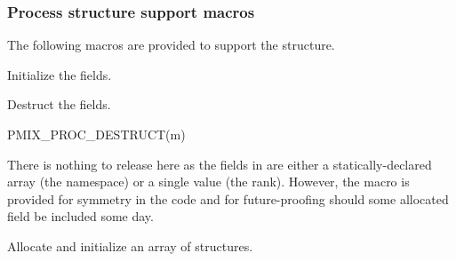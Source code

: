 \subsubsection{Process structure support macros}
The following macros are provided to support the  structure.


Initialize the  fields.


\begin{arglist}
\end{arglist}


Destruct the  fields.

\cspecificstart
\begin{codepar}
PMIX_PROC_DESTRUCT(m)
\end{codepar}
\cspecificend

\begin{arglist}
\end{arglist}

There is nothing to release here as the fields in  are either a statically-declared array (the namespace) or a single value (the rank). However, the macro is provided for symmetry in the code and for future-proofing should some allocated field be included some day.


Allocate and initialize an array of  structures.


\begin{arglist}
\end{arglist}



